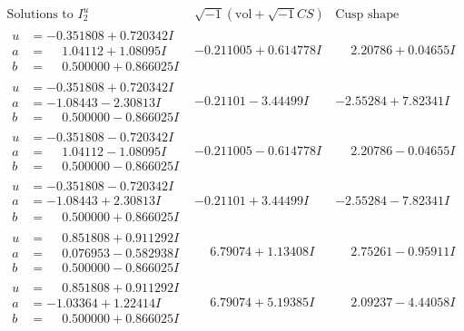 \documentclass[1p]{elsarticle_modified}
\theoremstyle{definition}
\newcommand{\I}{\sqrt{-1}}
\begin{document}
$$\begin{array}{c|c|c}  
\text{Solutions to }I^u_{2}& \I (\text{vol} + \sqrt{-1}CS) & \text{Cusp shape}\\
 \hline 
\begin{aligned}
u &= -0.351808 + 0.720342 I \\
a &= \phantom{-}1.04112 + 1.08095 I \\
b &= \phantom{-}0.500000 + 0.866025 I\end{aligned}
 & -0.211005 + 0.614778 I & \phantom{-}2.20786 + 0.04655 I \\ \hline\begin{aligned}
u &= -0.351808 + 0.720342 I \\
a &= -1.08443 - 2.30813 I \\
b &= \phantom{-}0.500000 - 0.866025 I\end{aligned}
 & -0.21101 - 3.44499 I & -2.55284 + 7.82341 I \\ \hline\begin{aligned}
u &= -0.351808 - 0.720342 I \\
a &= \phantom{-}1.04112 - 1.08095 I \\
b &= \phantom{-}0.500000 - 0.866025 I\end{aligned}
 & -0.211005 - 0.614778 I & \phantom{-}2.20786 - 0.04655 I \\ \hline\begin{aligned}
u &= -0.351808 - 0.720342 I \\
a &= -1.08443 + 2.30813 I \\
b &= \phantom{-}0.500000 + 0.866025 I\end{aligned}
 & -0.21101 + 3.44499 I & -2.55284 - 7.82341 I \\ \hline\begin{aligned}
u &= \phantom{-}0.851808 + 0.911292 I \\
a &= \phantom{-}0.076953 - 0.582938 I \\
b &= \phantom{-}0.500000 - 0.866025 I\end{aligned}
 & \phantom{-}6.79074 + 1.13408 I & \phantom{-}2.75261 - 0.95911 I \\ \hline\begin{aligned}
u &= \phantom{-}0.851808 + 0.911292 I \\
a &= -1.03364 + 1.22414 I \\
b &= \phantom{-}0.500000 + 0.866025 I\end{aligned}
 & \phantom{-}6.79074 + 5.19385 I & \phantom{-}2.09237 - 4.44058 I \\ \hline\begin{aligned}

\end{aligned}
\end{array}$$
\end{document}
